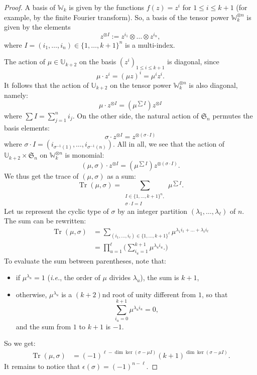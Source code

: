 \documentclass[11pt]{article}
\theoremstyle{definition}
\newcommand{\bU}{\mathbb{U}}
\newcommand{\bW}{\mathbb{W}}
\begin{document}
\begin{proof}
A basis of $\bW_k$ is given by the functions $f(z) = z^i$ for $1\leq i \leq k+1$ (for example, by the finite Fourier transform).  So, a basis of the tensor power $\bW_k^{\otimes n}$ is given by the elements
\[
    z^{\otimes I} := z^{i_1} \otimes \dots \otimes z^{i_n},
\]
where $I = (i_1,\dots,i_n) \in \{1,\dots,k+1\}^n$ is a multi-index. 

The action of $\mu\in\bU_{k+2}$ on the basis $(z^i)_{1 \leq i \leq k+1}$ is diagonal, since
\[
    \mu \cdot z^i = (\mu z)^i = \mu^i z^i.
\]
It follows that the action of $\bU_{k+2}$ on the tensor power $\bW_k^{\otimes n}$ is also diagonal, namely:
\[
    \mu \cdot z^{\otimes I} 
        =
    (\mu^{\sum I}) z^{\otimes I}
\]
where $\sum I = \sum_{j=1}^n i_j$.  On the other side, the natural action of $\mathfrak{S}_n$ permutes the basis elements:
\[
    \sigma \cdot z^{\otimes I}
        =
    z^{\otimes (\sigma\cdot I)}
\]
where $\sigma \cdot I = (i_{\sigma^{-1}(1)}, \dots, i_{\sigma^{-1}(n)} )$.  All in all, we see that the action of $\bU_{k+2} \times \mathfrak{S}_n$ on $\bW_k^{\otimes n}$ is monomial:
\[
    (\mu,\sigma) \cdot z^{\otimes I}
        =
    (\mu^{\sum I}) z^{\otimes (\sigma\cdot I)}.
\]
We thus get the trace of $(\mu,\sigma)$ as a sum:
\[
    \operatorname{Tr}(\mu,\sigma)
        =
    \sum_{\substack{I \in \{1,\dots,k+1\}^n, \\ \sigma\cdot I = I}} \mu^{\sum I}.
\]
Let us represent the cyclic type of $\sigma$ by an integer partition $(\lambda_1,\dots,\lambda_\ell)$ of $n$.  The sum can be rewritten:
\begin{align*}
    \operatorname{Tr}(\mu,\sigma)
        &=
    \sum_{(i_1,\dots,i_\ell) \in \{1,\dots,k+1\}^\ell} \mu^{\lambda_1 i_1 + \dots + \lambda_\ell i_\ell} \\[2mm]
        &=
    \prod_{u=1}^\ell \bigg(
        \sum_{i_u = 1}^{k+1} \mu^{\lambda_u i_u}.
    \bigg)
\end{align*}
To evaluate the sum between parentheses, note that:
\begin{itemize}
    \item if $\mu^{\lambda_u} = 1$ ({\it i.e.}, the order of $\mu$ divides $\lambda_u$), the sum is $k+1$,
    \item otherwise, $\mu^{\lambda_u}$ is a $(k+2)$nd root of unity different from $1$, so that 
    \[
        \sum_{i_u = 0}^{k+1} \mu^{\lambda_u i_u}
            = 
        0,
    \]
    and the sum from $1$ to $k+1$ is $-1$.
\end{itemize}
So we get:
\begin{align*}
    \operatorname{Tr}(\mu,\sigma)
        &=
    (-1)^{\ell - \dim\ker(\sigma-\mu I)} (k+1)^{\dim\ker(\sigma-\mu I)}.
\end{align*}
It remains to notice that $\epsilon(\sigma) = (-1)^{n-\ell}$.
\end{proof}
\end{document}
